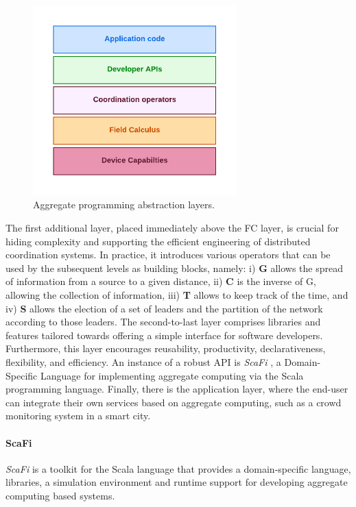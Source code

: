 \documentclass[12pt,a4paper,openright,twoside]{book}
\begin{document}
\begin{figure}[t]
    \centering
    \includegraphics[width=0.7\textwidth]{figures/AC-layers.pdf}
    \caption{Aggregate programming abstraction layers.}
    \label{fig:ac-layers}
\end{figure}

The first additional layer, placed immediately above the FC layer, is crucial for hiding complexity and supporting the 
    efficient engineering of distributed coordination systems. In practice, it introduces various operators that can 
    be used by the subsequent levels as building blocks, namely:
    i) \textbf{G} allows the spread of information from a source to a given distance,
    ii) \textbf{C} is the inverse of G, allowing the collection of information,
    iii) \textbf{T} allows to keep track of the time, and
    iv) \textbf{S} allows the election of a set of leaders and the partition of the network according to those leaders. 
The second-to-last layer comprises libraries and features tailored towards offering a simple interface for 
    software developers. Furthermore, this layer encourages reusability, productivity, declarativeness, 
    flexibility, and efficiency. An instance of a robust API is \emph{ScaFi} \cite{casadei2022scafi}, a Domain-Specific 
    Language for implementing aggregate computing via the Scala programming language.
Finally, there is the application layer, where the end-user can integrate their own services based on aggregate computing, 
    such as a crowd monitoring system in a smart city.

\paragraph{ScaFi}
\emph{ScaFi} \cite{casadei2022scafi} is a toolkit for the Scala language that provides a domain-specific language, libraries, 
    a simulation environment and runtime support for developing aggregate computing based systems.
\end{document}
